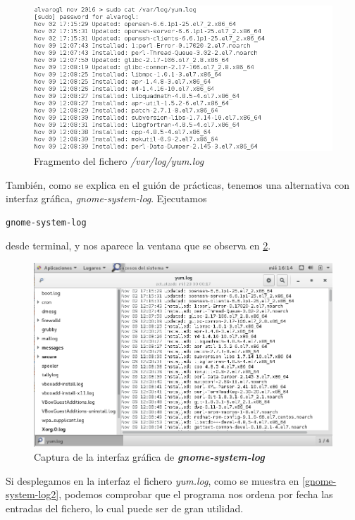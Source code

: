 \begin{figure}[H]
	\centering
	\includegraphics[scale=0.6]{cuestion1-yumlog.png}
	\caption{Fragmento del fichero \textit{/var/log/yum.log}} \label{yumlog}
\end{figure}

También, como se explica en el guión de prácticas, tenemos una alternativa con interfaz gráfica, \textit{\textit{gnome-system-log}}.
Ejecutamos \begin{verbatim}
gnome-system-log
\end{verbatim} desde terminal, y nos aparece la ventana que se observa en \ref{gnome-system-log}.

\begin{figure}[H]
	\centering
	\includegraphics[scale=0.6]{cuestion1-gnomesyslog.png}
	\caption{Captura de la interfaz gráfica de \textbf{\textit{gnome-system-log}}} \label{gnome-system-log}
\end{figure}

Si desplegamos en la interfaz el fichero \textit{yum.log}, como se muestra en \ref{gnome-system-log2}, podemos comprobar que el programa nos ordena por fecha las entradas del fichero, lo cual puede ser de gran utilidad.

